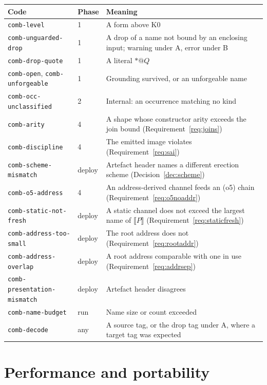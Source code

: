 \documentclass[11pt,a4paper]{article}
\makeatletter
\newcommand{\code}[1]{\texttt{#1}}
\newcommand{\quo}[1]{@#1}
\newcommand{\drp}[1]{{*}#1}
\newcommand{\enc}[1]{\llbracket #1 \rrbracket}
\theoremstyle{definition}
\theoremstyle{plain}
\makeatother
\begin{document}
\begin{center}
\begin{tabularx}{\linewidth}{@{}ll>{\raggedright\arraybackslash}X@{}}
\toprule
Code & Phase & Meaning\\
\midrule
\code{comb-level} & 1 & A form above K0\\
\code{comb-unguarded-drop} & 1 & A drop of a name not bound by an enclosing
input; warning under A, error under B\\
\code{comb-drop-quote} & 1 & A literal $\drp{\quo{Q}}$\\
\code{comb-open}, \code{comb-unforgeable} & 1 & Grounding survived, or an
unforgeable name\\
\code{comb-occ-unclassified} & 2 & Internal: an occurrence matching no kind\\
\code{comb-arity} & 4 & A shape whose constructor arity exceeds the join bound
(Requirement~\ref{req:joins})\\
\code{comb-discipline} & 4 & The emitted image violates
\cite[Def.~6.10]{draft3} (Requirement~\ref{req:sai})\\
\code{comb-scheme-mismatch} & deploy & Artefact header names a different
erection scheme (Decision~\ref{dec:scheme})\\
\code{comb-o5-address} & 4 & An address-derived channel feeds an (o5) chain
(Requirement~\ref{req:o5noaddr})\\
\code{comb-static-not-fresh} & deploy & A static channel does not exceed the
largest name of $\enc{P}$ (Requirement~\ref{req:staticfresh})\\
\code{comb-address-too-small} & deploy & The root address does not
(Requirement~\ref{req:rootaddr})\\
\code{comb-address-overlap} & deploy & A root address comparable with one in
use (Requirement~\ref{req:addrsep})\\
\code{comb-presentation-mismatch} & deploy & Artefact header disagrees\\
\code{comb-name-budget} & run & Name size or count exceeded\\
\code{comb-decode} & any & A source tag, or the drop tag under A, where a
target tag was expected\\
\bottomrule
\end{tabularx}
\end{center}

\section{Performance and portability}\label{sec:perf}
\end{document}
